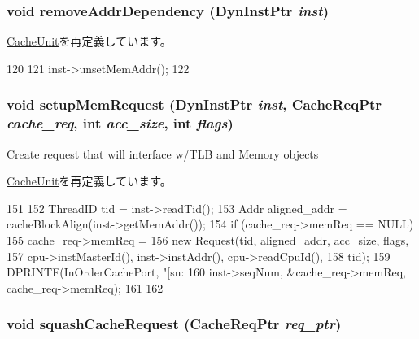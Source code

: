 \hypertarget{classFetchUnit_a8a894d91761439227fd27d91a318c31f}{
\subsubsection[{removeAddrDependency}]{\setlength{\rightskip}{0pt plus 5cm}void removeAddrDependency ({\bf DynInstPtr} {\em inst})}}
\label{classFetchUnit_a8a894d91761439227fd27d91a318c31f}


\hyperlink{classCacheUnit_a8a894d91761439227fd27d91a318c31f}{CacheUnit}を再定義しています。


\begin{DoxyCode}
120 {
121     inst->unsetMemAddr();
122 }
\end{DoxyCode}
\hypertarget{classFetchUnit_aa942d730ea26d41b72db771cc951f51e}{
\subsubsection[{setupMemRequest}]{\setlength{\rightskip}{0pt plus 5cm}void setupMemRequest ({\bf DynInstPtr} {\em inst}, \/  {\bf CacheReqPtr} {\em cache\_\-req}, \/  int {\em acc\_\-size}, \/  int {\em flags})}}
\label{classFetchUnit_aa942d730ea26d41b72db771cc951f51e}
Create request that will interface w/TLB and Memory objects 

\hyperlink{classCacheUnit_aa942d730ea26d41b72db771cc951f51e}{CacheUnit}を再定義しています。


\begin{DoxyCode}
151 {
152     ThreadID tid = inst->readTid();
153     Addr aligned_addr = cacheBlockAlign(inst->getMemAddr());
154     if (cache_req->memReq == NULL) {
155         cache_req->memReq =
156             new Request(tid, aligned_addr, acc_size, flags,
157                         cpu->instMasterId(), inst->instAddr(), cpu->readCpuId(),
158                         tid);
159         DPRINTF(InOrderCachePort, "[sn:%
160                 inst->seqNum, &cache_req->memReq, cache_req->memReq);
161     }
162 }
\end{DoxyCode}
\hypertarget{classFetchUnit_ac2831520eb121be08811b040992f416b}{
\subsubsection[{squashCacheRequest}]{\setlength{\rightskip}{0pt plus 5cm}void squashCacheRequest ({\bf CacheReqPtr} {\em req\_\-ptr})}}
\label{classFetchUnit_ac2831520eb121be08811b040992f416b}


